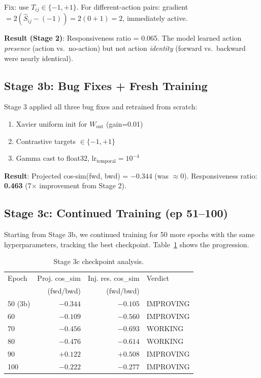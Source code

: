 \documentclass[10pt,twocolumn]{article}
\begin{document}
Fix: use $T_{ij} \in \{-1, +1\}$. For different-action pairs: gradient $= 2(\hat{S}_{ij} - (-1)) = 2(0 + 1) = 2$, immediately active.

\textbf{Result (Stage 2)}: Responsiveness ratio = 0.065. The model learned action \emph{presence} (action vs.\ no-action) but not action \emph{identity} (forward vs.\ backward were nearly identical).

\subsection{Stage 3b: Bug Fixes + Fresh Training}

Stage 3 applied all three bug fixes and retrained from scratch:
\begin{enumerate}
  \item Xavier uniform init for $W_\text{out}$ (gain=0.01)
  \item Contrastive targets $\in \{-1, +1\}$
  \item Gamma cast to float32, $\text{lr}_\text{temporal} = 10^{-4}$
\end{enumerate}

\textbf{Result}: Projected cos-sim(fwd, bwd) = $-0.344$ (was $\approx 0$). Responsiveness ratio: \textbf{0.463} (7$\times$ improvement from Stage 2).

\subsection{Stage 3c: Continued Training (ep 51--100)}

Starting from Stage 3b, we continued training for 50 more epochs with the same hyperparameters, tracking the best checkpoint. Table~\ref{tab:stage3c} shows the progression.

\begin{table}[h]
\centering
\small
\caption{Stage 3c checkpoint analysis.}
\label{tab:stage3c}
\begin{tabular}{lrrl}
\toprule
Epoch & Proj. cos\_sim & Inj. res. cos\_sim & Verdict \\
       & (fwd/bwd) & (fwd/bwd) & \\
\midrule
50 (3b) & $-0.344$ & $-0.105$ & IMPROVING \\
60 & $-0.109$ & $-0.560$ & IMPROVING \\
70 & $-0.456$ & $-0.693$ & WORKING \\
80 & $-0.476$ & $-0.614$ & WORKING \\
90 & $+0.122$ & $+0.508$ & IMPROVING \\
100 & $-0.222$ & $-0.277$ & IMPROVING \\
\bottomrule
\end{tabular}
\end{table}
\end{document}
